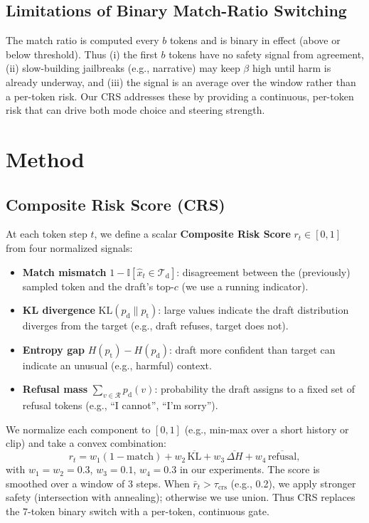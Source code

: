 \documentclass[11pt,a4paper]{article}
\begin{document}
\subsection{Limitations of Binary Match-Ratio Switching}
The match ratio is computed every $b$ tokens and is binary in effect (above or below threshold). Thus (i) the first $b$ tokens have no safety signal from agreement, (ii) slow-building jailbreaks (e.g., narrative) may keep $\beta$ high until harm is already underway, and (iii) the signal is an average over the window rather than a per-token risk. Our CRS addresses these by providing a continuous, per-token risk that can drive both mode choice and steering strength.

\section{Method}
\label{sec:method}

\subsection{Composite Risk Score (CRS)}
\label{sec:crs}

At each token step $t$, we define a scalar \textbf{Composite Risk Score} $r_t \in [0,1]$ from four normalized signals:

\begin{itemize}
  \item \textbf{Match mismatch} $1 - \mathbb{I}[\hat{x}_t \in \mathcal{T}_{\mathrm{d}}]$: disagreement between the (previously) sampled token and the draft's top-$c$ (we use a running indicator).
  \item \textbf{KL divergence} $\mathrm{KL}(p_{\mathrm{d}} \| p_{\mathrm{t}})$: large values indicate the draft distribution diverges from the target (e.g., draft refuses, target does not).
  \item \textbf{Entropy gap} $H(p_{\mathrm{t}}) - H(p_{\mathrm{d}})$: draft more confident than target can indicate an unusual (e.g., harmful) context.
  \item \textbf{Refusal mass} $\sum_{v \in \mathcal{R}} p_{\mathrm{d}}(v)$: probability the draft assigns to a fixed set of refusal tokens (e.g., ``I cannot'', ``I'm sorry'').
\end{itemize}

We normalize each component to $[0,1]$ (e.g., min-max over a short history or clip) and take a convex combination:
\begin{equation}
  r_t = w_1 (1-\mathrm{match}) + w_2 \,\overline{\mathrm{KL}} + w_3 \,\overline{\Delta H} + w_4 \,\overline{\mathrm{refusal}},
\end{equation}
with $w_1{=}w_2{=}0.3$, $w_3{=}0.1$, $w_4{=}0.3$ in our experiments. The score is smoothed over a window of 3 steps. When $\bar{r}_t > \tau_{\mathrm{crs}}$ (e.g., 0.2), we apply stronger safety (intersection with annealing); otherwise we use union. Thus CRS replaces the 7-token binary switch with a per-token, continuous gate.
\end{document}
